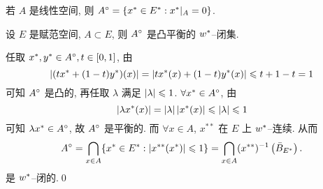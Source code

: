 \begin{Remark}
	若 $ A $ 是线性空间, 则 $ A^{\circ}=\{ x^{*}\in E^{*}:x^{*}|_{A}=0 \} $.
\end{Remark}
\begin{Proposition}\label{prop:极的w*闭性}
	设 $ E $ 是赋范空间, $ A\subset E $, 则 $ A^{\circ} $ 是凸平衡的 $ w^{*} $--闭集.
\end{Proposition}
\begin{Proof}
	任取 $ x^{*}, y^{*}\in A^{\circ}, t\in[0, 1] $, 由
	\[
		\left| (tx^{*}+(1-t)y^{*})(x) \right| =\left| tx^{*}(x)+(1-t)y^{*}(x) \right| \leqslant t+1-t=1
	\]
	可知 $ A^{\circ} $ 是凸的, 再任取 $ \lambda $ 满足 $ \left| \lambda \right| \leqslant1 $. $ \forall x^{*}\in A^{\circ} $, 由
	\[
		\left| \lambda x^{*}(x) \right| =\left| \lambda \right| \left| x^{*}(x) \right| \leqslant\left| \lambda \right| \leqslant1
	\]
	可知 $ \lambda x^{*}\in A^{\circ} $, 故 $ A^{\circ} $ 是平衡的. 而 $ \forall x\in A $, $ x^{**} $ 在 $ E $ 上 $ w^{*} $--连续. 从而
	\[
		A^{\circ}=\bigcap_{x\in A}\{ x^{*}\in E^{*}:\left| x^{**}(x^{*}) \right| \leqslant1 \}=\bigcap_{x\in A}(x^{**})^{-1}\left( \bar{B}_{E^{*}} \right).
	\]
	是 $ w^{*} $--闭的.\qed
\end{Proof}


